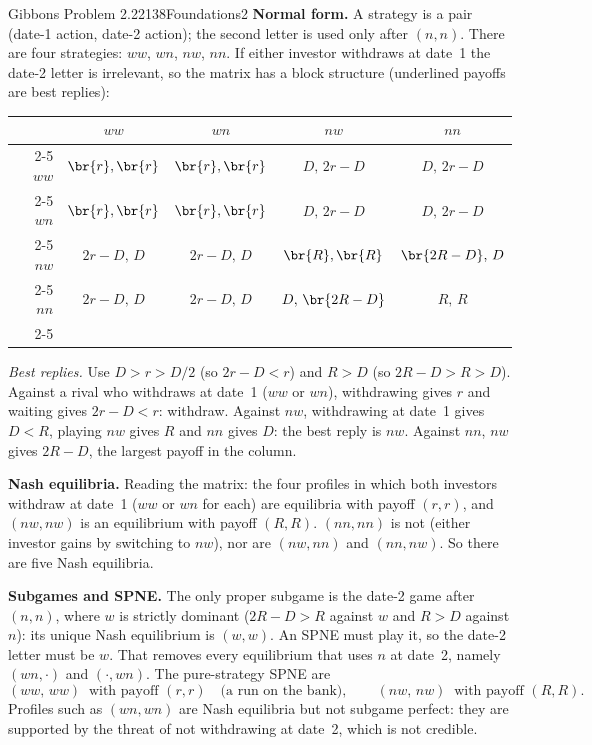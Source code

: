 \begin{exsol}{Gibbons Problem 2.22}{138}{Foundations}{2}
\textbf{Normal form.} A strategy is a pair (date-1 action, date-2 action); the second letter is used
only after $(n,n)$. There are four strategies: $ww$, $wn$, $nw$, $nn$. If either investor
withdraws at date~1 the date-2 letter is irrelevant, so the matrix has a block structure (underlined payoffs are best replies):
\begin{center}
\small
\begin{tabular}{r|c|c|c|c|}
\multicolumn{1}{r}{} & \multicolumn{1}{c}{$ww$} & \multicolumn{1}{c}{$wn$} & \multicolumn{1}{c}{$nw$} & \multicolumn{1}{c}{$nn$}\\ \cline{2-5}
$ww$ & $\br{r},\br{r}$ & $\br{r},\br{r}$ & $D,\,2r-D$ & $D,\,2r-D$ \\ \cline{2-5}
$wn$ & $\br{r},\br{r}$ & $\br{r},\br{r}$ & $D,\,2r-D$ & $D,\,2r-D$ \\ \cline{2-5}
$nw$ & $2r-D,\,D$ & $2r-D,\,D$ & $\br{R},\br{R}$ & $\br{2R-D},\,D$ \\ \cline{2-5}
$nn$ & $2r-D,\,D$ & $2r-D,\,D$ & $D,\,\br{2R-D}$ & $R,\,R$ \\ \cline{2-5}
\end{tabular}
\end{center}
\emph{Best replies.} Use $D > r > D/2$ (so $2r - D < r$) and $R > D$ (so $2R - D > R > D$).
Against a rival who withdraws at date~1 ($ww$ or $wn$), withdrawing gives $r$ and waiting gives
$2r - D < r$: withdraw. Against $nw$, withdrawing at date~1 gives $D < R$, playing $nw$ gives $R$ and $nn$
gives $D$: the best reply is $nw$. Against $nn$, $nw$ gives $2R - D$, the largest payoff in the column.

\textbf{Nash equilibria.} Reading the matrix: the four profiles in which both investors withdraw at
date~1 ($ww$ or $wn$ for each) are equilibria with payoff $(r,r)$, and $(nw, nw)$ is an equilibrium
with payoff $(R,R)$. $(nn,nn)$ is not (either investor gains by switching to $nw$), nor are
$(nw,nn)$ and $(nn,nw)$. So there are five Nash equilibria.

\textbf{Subgames and SPNE.} The only proper subgame is the date-2 game after $(n,n)$, where
$w$ is strictly dominant ($2R - D > R$ against $w$ and $R > D$ against $n$): its unique Nash
equilibrium is $(w,w)$. An SPNE must play it, so the date-2 letter must be $w$. That removes every
equilibrium that uses $n$ at date~2, namely $(wn,\cdot)$ and $(\cdot,wn)$. The pure-strategy SPNE are
\[
  (ww,\,ww) \ \text{ with payoff } (r,r) \quad\text{(a run on the bank)}, \qquad
  (nw,\,nw) \ \text{ with payoff } (R,R).
\]
Profiles such as $(wn,wn)$ are Nash equilibria but not subgame perfect: they are supported by the
threat of not withdrawing at date~2, which is not credible.


\end{exsol}
